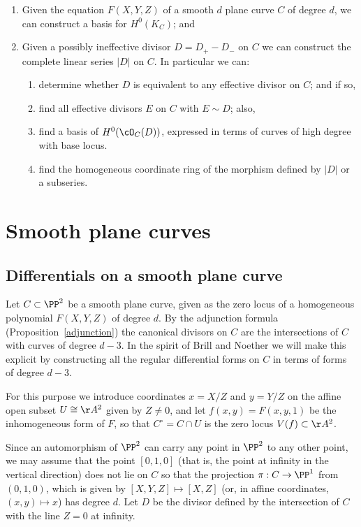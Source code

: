 \begin{enumerate}
\item Given the equation $F(X,Y,Z)$ of a smooth $d$ plane curve $C$
of degree $d$, we can
construct a basis for $H^0(K_C)$; and

\item  Given a possibly ineffective divisor $D = D_{+}-D_{-}$ on $C$ we can construct the complete linear series $|D|$ on $C$. In particular we can:
\begin{enumerate}
\item determine whether $D$ is equivalent to any effective divisor on $C$; and if so,
 \item find all effective divisors $E$ on $C$ with $E \sim D$; also,
 \item find a basis of $H^0(\cO_C(D))$, expressed in terms of curves of high degree with  base locus.
 \item find the homogeneous coordinate ring of the morphism defined by $|D|$ or a subseries.
\end{enumerate}
\end{enumerate}

\section{Smooth plane curves}\label{smooth plane curves}

\subsection{Differentials on a smooth plane curve}\label{canonical series on smooth plane curves}

Let $C \subset \PP^2$  be a smooth plane curve, given as the zero locus of a homogeneous polynomial $F(X,Y,Z)$ of degree $d$. By the adjunction formula (Proposition~\ref{adjunction}) the canonical  divisors on $C$
are the intersections of $C$ with curves of degree $d-3$. In the spirit of Brill and Noether we
will make this explicit by constructing all
 the regular differential forms on $C$ in terms of forms of degree $d-3$.


For this purpose we introduce coordinates $x = X/Z$ and $y = Y/Z$ on the affine open subset $U \cong \AA^2$ given by $Z \neq 0$, and let $f(x,y) = F(x, y,1)$ be the inhomogeneous form of $F$, so that $C^\circ = C \cap U$ is the zero locus $V(f) \subset  \AA^2$. 

Since an automorphism of $\PP^2$ can carry any point in $\PP^{2}$ to any other point, we may assume
that 
 the point $[0,1,0]$ (that is, the point at infinity in the vertical direction) does not lie on $C$ so that the
 projection  $\pi: C \to \PP^1$ from $(0,1,0)$, which is given by $[X,Y,Z] \mapsto [X,Z]$ (or, in affine coordinates, $(x,y) \mapsto x$)  has degree $d$. Let $D$ be the divisor defined by the intersection of $C$ with the line $Z=0$ at infinity.

